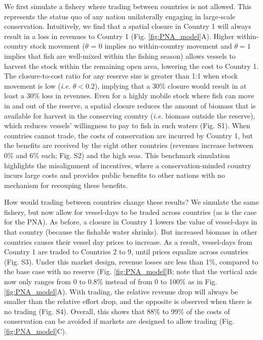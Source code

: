 \documentclass[12pt]{article}
\begin{document}
We first simulate a fishery where trading between countries is not allowed. This represents the status quo of any nation unilaterally engaging in large-scale conservation. Intuitively, we find that a spatial closure in Country 1 will always result in a loss in revenues to Country 1 (Fig. \ref{fig:PNA_model}A). Higher within-country stock movement ($\theta$ = 0 implies no within-country movement and $\theta = 1$ implies that fish are well-mixed within the fishing season) allows vessels to harvest the stock within the remaining open area, lowering the cost to Country 1. The closure-to-cost ratio for any reserve size is greater than 1:1 when stock movement is low (\emph{i.e.} $\theta < 0.2$), implying that a 30\% closure would result in at least a 30\% loss in revenues. Even for a highly mobile stock where fish can move in and out of the reserve, a spatial closure reduces the amount of biomass that is available for harvest in the conserving country (\emph{i.e.} biomass outside the reserve), which reduces vessels' willingness to pay to fish in such waters (Fig. S1). When countries cannot trade, the costs of conservation are incurred by Country 1, but the benefits are received by the eight other countries (revenues increase between 0\% and 6\% each; Fig. S2) and the high seas. This benchmark simulation highlights the misalignment of incentives, where a conservation-minded country incurs large costs and provides public benefits to other nations with no mechanism for recouping these benefits.

How would trading between countries change these results? We simulate the same fishery, but now allow for vessel-days to be traded across countries (as is the case for the PNA). As before, a closure in Country 1 lowers the value of vessel-days in that country (because the fishable water shrinks). But increased biomass in other countries causes their vessel day prices to increase. As a result, vessel-days from Country 1 are traded to Countries 2 to 9, until prices equalize across countries (Fig. S3). Under this market design, revenue losses are less than 1\%, compared to the base case with no reserve (Fig. \ref{fig:PNA_model}B; note that the vertical axis now only ranges from 0 to 0.8\% instead of from 0 to 100\% as in Fig. \ref{fig:PNA_model}A). With trading, the relative revenue drop will always be smaller than the relative effort drop, and the opposite is observed when there is no trading (Fig. S4). Overall, this shows that 88\% to 99\% of the costs of conservation can be avoided if markets are designed to allow trading (Fig. \ref{fig:PNA_model}C).
\end{document}
